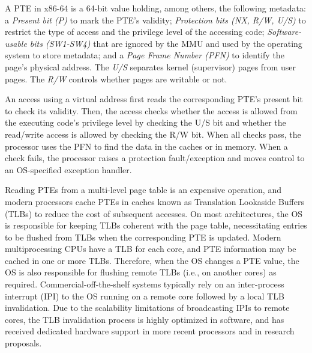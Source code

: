A PTE in x86-64 is a 64-bit value holding, among others, the following metadata:
a \emph{Present bit (P)} to mark the PTE's validity;
\emph{Protection bits (NX, R/W, U/S)} to restrict the type of
access and the privilege level of the accessing code;
\emph{Software-usable bits (SW1-SW4)} that are ignored by the MMU and used by 
the operating system to store metadata; and
a \emph{Page Frame Number (PFN)} to identify the page's physical address.
The \emph{U/S} separates kernel (supervisor) pages from user pages.
The \emph{R/W} controls whether pages are writable or not.

An access using a virtual address first reads the corresponding PTE's
present bit to check its validity.
Then, the access checks whether the access is allowed from the executing
code's privilege level by checking the U/S bit and whether the
read/write access is allowed by checking the R/W bit.
When all checks pass, the processor uses the PFN to find the data in
the caches or in memory.
When a check fails, the processor raises a protection fault/exception and
moves control to an OS-specified exception handler.

Reading PTEs from a multi-level page table is an expensive operation, and
modern processors cache PTEs in caches known as Translation Lookaside
Buffers (TLBs) to reduce the cost of subsequent accesses.
On most architectures, the OS is responsible for keeping TLBs coherent with
the page table, necessitating entries to be flushed from TLBs when the
corresponding PTE is updated.
Modern multiprocessing CPUs have a TLB for each core, and PTE information
may be cached in one or more TLBs.
Therefore, when the OS changes a PTE value, the OS is also responsible for
flushing remote TLBs (i.e., on another cores) as required.
Commercial-off-the-shelf systems typically rely on an inter-process 
interrupt (IPI) to the OS running on a remote core followed by a local TLB 
invalidation.
Due to the scalability limitations of broadcasting IPIs to remote cores, 
the TLB invalidation process is highly optimized in software, and has
received dedicated hardware support in more recent processors and in research
proposals.

